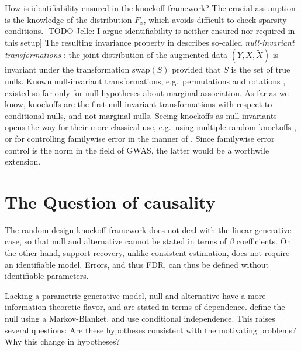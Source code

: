 \documentclass[article,lineno]{biometrika}
\begin{document}
How is identifiability ensured in the knockoff framework?
The crucial assumption is the knowledge of the distribution $F_x$, which avoids difficult to check sparsity conditions.
[TODO Jelle: I argue identifiability is neither ensured nor required in this setup]
The resulting invariance property in \cite{SesiaGenehuntinghidden} describes so-called \emph{null-invariant transformations} \citep{Goeman2010}: 
the joint distribution of the augmented data $(Y,X,\tilde X)$ is invariant under the transformation $\textrm{swap}(S)$ provided that $S$ is the set of true nulls.
Known null-invariant transformations, e.g.\ permutations and rotations \citep{Langsrud2005}, existed so far only for null hypotheses about marginal association.
As far as we know, knockoffs are the first null-invariant transformations with respect to conditional nulls, and not marginal nulls.
Seeing knockoffs as null-invariants opens the way for their more classical use, e.g.\ using multiple random knockoffs \citep{Hemerik2018}, or for controlling familywise error in the manner of \cite{Westfall1993}.
Since familywise error control is the norm in the field of GWAS, the latter would be a worthwile extension.


\section{The Question of causality}

The random-design knockoff framework does not deal with the linear generative case, so that null and alternative cannot be stated in terms of $\beta$ coefficients.
On the other hand, support recovery, unlike consistent estimation, does not require an identifiable model.
Errors, and thus FDR, can thus be defined without identifiable parameters.

Lacking a parametric generative model, null and alternative have a more information-theoretic flavor, and are stated in terms of dependence.
\citet{CandesPanninggoldmodelX2018} define the null using a Markov-Blanket, and \cite{SesiaGenehuntinghidden} use conditional independence.
This raises several questions:
Are these hypotheses consistent with the motivating problems?
Why this change in hypotheses?
\end{document}
